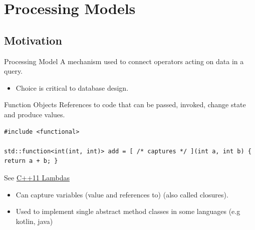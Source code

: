 \chapter{Processing Models}

\section{Motivation}
\begin{definitionbox}{Processing Model}
  A mechanism used to connect operators acting on data in a query.
  \begin{itemize}
    \item Choice is critical to database design.
  \end{itemize}
\end{definitionbox}

\begin{definitionbox}{Function Objects}
  References to code that can be passed, invoked, change state and produce values.
  \toimprove
  \begin{verbatim}
#include <functional>

std::function<int(int, int)> add = [ /* captures */ ](int a, int b) { return a + b; }
    \end{verbatim}
  See \href{https://en.cppreference.com/w/cpp/language/lambda}{C++11 Lambdas}
  \begin{itemize}
    \item Can capture variables (value and references to) (also called closures).
    \item Used to implement single abstract method classes in some languages (e.g kotlin, java)
  \end{itemize}
\end{definitionbox}

